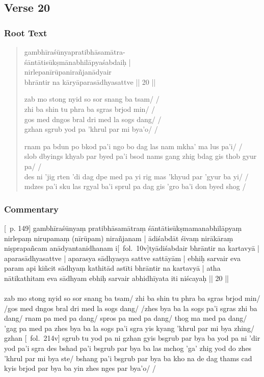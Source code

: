 \documentclass[12pt]{article}
\begin{document}
\subsection{Verse 20}
\subsubsection{Root Text}
\begin{quote}
	gambhīraśūnyapratibhāsamātra\footnoteB{
		°mātra°] \EDD ; mātraṃ \MS
	}-\\
	śāntāti\footnoteB{
		śāntāti] \EDD ; sāntādi \MS
	}sūkṣmānabhilāpyaśabdaiḥ |\\
	nirlepanīrūpa\footnoteB{
		nirlepanīrūpa°] \EDD\ (\emd) ; nirlepanīpa \MS
	}nirañjanādyair \\
	bhrāntir na kāryāparasādhyasattve || 20 ||

	zab mo stong nyid so sor snang ba tsam/ /\\
	zhi ba shin tu phra ba sgras brjod min/ /\\
	gos med dngos bral dri med la sogs dang/ /\\
	gzhan sgrub yod pa 'khrul par mi bya'o/ /

	rnam pa bdun po bkod pa'i ngo bo dag las nam mkha' ma lus pa'i/ /\\
	slob dbyings khyab par byed pa'i bsod nams gang zhig bdag gis thob gyur pa/ /\\
	des ni 'jig rten 'di dag dpe med pa yi rig mas 'khyud par 'gyur ba yi/ /\\
	mdzes pa'i sku las rgyal ba'i sprul pa dag gis 'gro ba'i don byed shog /
\end{quote}

\subsubsection{Commentary}
[\EDD\ p. 149] gambhīraśūnyaṃ pratibhāsamātraṃ śāntātisūkṣmamanabhilāpyaṃ nirlepaṃ nirupamaṃ (nīrūpam) nirañjanam | ādiśabdāt śivaṃ nirākāraṃ niṣprapañcam anādyantanidhanam i[\MS\ fol.\ 10v]tyādiśabdair bhrāntir na kartavyā | aparasādhyasattve | aparasya sādhyasya sattve sattāyām | ebhiḥ sarvair eva param api kiñcit sādhyaṃ kathitād astīti bhrāntir na kartavyā | atha nātikathitam eva sādhyam ebhiḥ sarvair abhidhīyata iti niścayaḥ || 20 ||\\

\textbf{\TVA}\\
zab mo stong nyid so sor snang ba tsam/ zhi ba shin tu phra ba sgras brjod min/ /gos med dngos bral dri med la sogs dang/ /zhes bya ba la sogs pa'i sgras zhi ba dang/ rnam pa med pa dang/ spros pa med pa dang/ thog ma med pa dang/ 'gag pa med pa zhes bya ba la sogs pa'i sgra yis kyang 'khrul par mi bya zhing/ gzhan [\TVA\ fol.\ 214v] sgrub tu yod pa ni gzhan gyis bsgrub par bya ba yod pa ni 'dir yod pa'i sgra des bshad pa'i bsgrub par bya ba las mchog 'ga' zhig yod do zhes 'khrul par mi bya ste/ bshang pa'i bsgrub par bya ba kho na de dag thams cad kyis brjod par bya ba yin zhes nges par bya'o/ /\\
\end{document}
